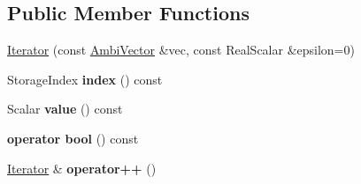 \subsection*{Public Member Functions}
\begin{DoxyCompactItemize}
\item 
\mbox{\hyperlink{class_eigen_1_1internal_1_1_ambi_vector_1_1_iterator_a2201eecfa8e104d9f2017e47c5f24583}{Iterator}} (const \mbox{\hyperlink{class_eigen_1_1internal_1_1_ambi_vector}{Ambi\+Vector}} \&vec, const Real\+Scalar \&epsilon=0)
\item 
\mbox{\label{class_eigen_1_1internal_1_1_ambi_vector_1_1_iterator_a60d302a0d837b10f02287c3de4f519ad}} 
Storage\+Index {\bfseries index} () const
\item 
\mbox{\label{class_eigen_1_1internal_1_1_ambi_vector_1_1_iterator_a7722c457498fd469be1e2adcc9c9c9fe}} 
Scalar {\bfseries value} () const
\item 
\mbox{\label{class_eigen_1_1internal_1_1_ambi_vector_1_1_iterator_a9a5264787033e4f7c46dba391a55e04d}} 
{\bfseries operator bool} () const
\item 
\mbox{\label{class_eigen_1_1internal_1_1_ambi_vector_1_1_iterator_a567260746471f2963051cf51ebe38860}} 
\mbox{\hyperlink{class_eigen_1_1internal_1_1_ambi_vector_1_1_iterator}{Iterator}} \& {\bfseries operator++} ()
\end{DoxyCompactItemize}
